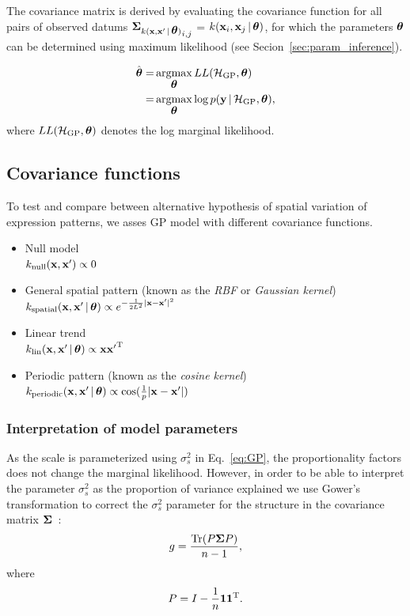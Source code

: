 The covariance matrix is derived by evaluating the covariance function for all pairs of observed datums $ {\mbox{\boldmath $\Sigma$}_{k({\bf x},{\bf x}'\,|\, \mbox{\boldmath $\theta$})}}_{i,j} $ = $ k({\bf x}_i,{\bf x}_j \,|\, \mbox{\boldmath $\theta$})$, for which the parameters $\mbox{\boldmath $\theta$}$ can be determined using maximum likelihood (see Secion~\ref{sec:param_inference}).

\begin{align}
\label{eq:LML}
\hat{\btheta} =& \argmax_{\btheta} LL(\GPM, \btheta) \\
              =& \argmax_{\btheta} \log p(\bfy \given \GPM,\btheta), \nonumber
\end{align}
where $LL(\mathcal{H}_{\text{GP}}, \mbox{\boldmath $\theta$})$ denotes the log marginal likelihood.

\subsection{Covariance functions}
\label{sec:covariance_functions}
To test and compare between alternative hypothesis of spatial variation of expression patterns, we asses GP model with different covariance functions.
\begin{itemize}
\item Null model \\
$k_{\text{null}}({\bf x},{\bf x}')\propto 0$\\
\item General spatial pattern (known as the \textit{RBF} or \textit{Gaussian kernel}) \\
$k_{\text{spatial}}({\bf x},{\bf x}' \,|\, \mbox{\boldmath $\theta$}) \propto e^{ {-\frac{1}{2L^2} | {\bf x}-{\bf x}' |^2}}$\\
\item Linear trend \\
$k_{\text{lin}}({\bf x},{\bf x}' \,|\, \mbox{\boldmath $\theta$}) \propto {\bf x}{{\bf x}'}^{{\rm T}}$\\
\item Periodic pattern (known as the \textit{cosine kernel}) \\
$k_{\text{periodic}}({\bf x},{\bf x}' \,|\, \mbox{\boldmath $\theta$}) \propto \cos({\frac{1}{p} | {\bf x}-{\bf x}' |})$
\end{itemize}

\subsubsection*{Interpretation of model parameters}

As the scale is parameterized using $ \sigma_s^2 $ in Eq.~\ref{eq:GP}, the proportionality factors does not change the marginal likelihood. However, in order to be able to interpret the parameter $ \sigma_s^2 $ as the proportion of variance explained we use Gower's transformation to correct the $ \sigma_s^2 $ parameter for the structure in the covariance matrix $ \mbox{\boldmath $\Sigma$} $~\cite{Kostem2013-gm}:
\[
g = \frac{\mbox{Tr} (P \mbox{\boldmath $\Sigma$} P)}{n - 1},
\]
where
\[
P = I - \frac{1}{n} {\bf 1} {\bf 1}^{{\rm T}}.
\]

